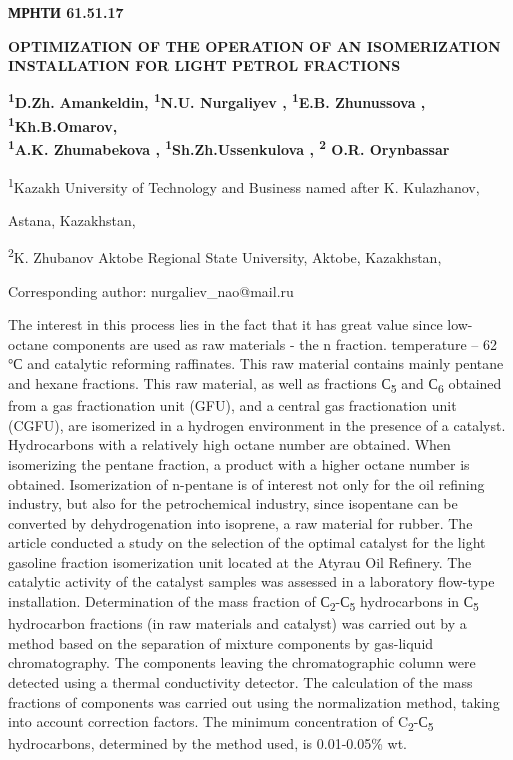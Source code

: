 \newpage
{\bfseries МРНТИ 61.51.17}

{\bfseries OPTIMIZATION OF THE OPERATION OF AN ISOMERIZATION INSTALLATION
FOR LIGHT PETROL FRACTIONS}

{\bfseries \textsuperscript{1}D.Zh.} {\bfseries Amankeldin,
\textsuperscript{1}N.U. Nurgaliyev , \textsuperscript{1}E.B. Zhunussova
, \textsuperscript{1}Kh.B.Omarov,\\
\textsuperscript{1}A.K. Zhumabekova ,
\textsuperscript{1}Sh.Zh.Ussenkulova , \textsuperscript{2} O.R.
Orynbassar}

\textsuperscript{1}Kazakh University of Technology and Business named
after K. Kulazhanov,

Astana, Kazakhstan,

\textsuperscript{2}K. Zhubanov Aktobe Regional State University, Aktobe,
Kazakhstan,

Corresponding author: nurgaliev\_nao@mail.ru

The interest in this process lies in the fact that it has great value
since low-octane components are used as raw materials - the n fraction.
temperature -- 62 °С and catalytic reforming raffinates. This raw
material contains mainly pentane and hexane fractions. This raw
material, as well as fractions С\textsubscript{5} and С\textsubscript{6}
obtained from a gas fractionation unit (GFU), and a central gas
fractionation unit (CGFU), are isomerized in a hydrogen environment in
the presence of a catalyst. Hydrocarbons with a relatively high octane
number are obtained. When isomerizing the pentane fraction, a product
with a higher octane number is obtained. Isomerization of n-pentane is
of interest not only for the oil refining industry, but also for the
petrochemical industry, since isopentane can be converted by
dehydrogenation into isoprene, a raw material for rubber. The article
conducted a study on the selection of the optimal catalyst for the light
gasoline fraction isomerization unit located at the Atyrau Oil Refinery.
The catalytic activity of the catalyst samples was assessed in a
laboratory flow-type installation. Determination of the mass fraction of
С\textsubscript{2}-С\textsubscript{5} hydrocarbons in С\textsubscript{5}
hydrocarbon fractions (in raw materials and catalyst) was carried out by
a method based on the separation of mixture components by gas-liquid
chromatography. The components leaving the chromatographic column were
detected using a thermal conductivity detector. The calculation of the
mass fractions of components was carried out using the normalization
method, taking into account correction factors. The minimum
concentration of C\textsubscript{2}-С\textsubscript{5} hydrocarbons,
determined by the method used, is 0.01-0.05\% wt.

